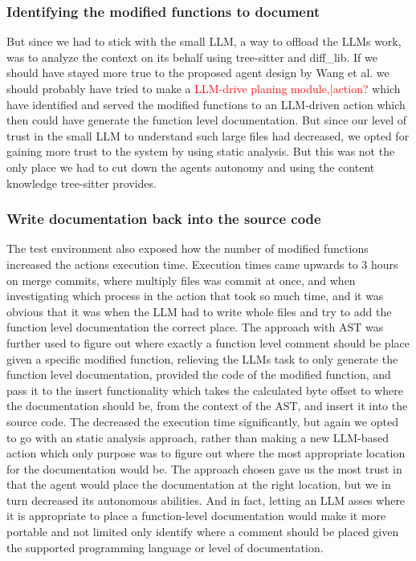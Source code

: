 \subsubsection*{Identifying the modified functions to document}
But since we had to stick with the small LLM, a way to offload the LLMs work, was to analyze the context on its behalf using tree-sitter and diff\_lib. If we should have stayed more true to the proposed agent design by Wang et al.\cite{wang2024survey} we should probably have tried to make a \textcolor{red}{LLM-drive planing module,|action?} which have identified and served the modified functions to an LLM-driven action which then could have generate the function level documentation. But since our level of trust in the small LLM to understand such large files had decreased, we opted for gaining more trust to the system by using static analysis. But this was not the only place we had to cut down the agents autonomy and using the content knowledge tree-sitter provides.
\subsubsection*{Write documentation back into the source code}
The test environment also exposed how the number of modified functions increased the actions execution time.
Execution times came upwards to 3 hours on merge commits, where multiply files was commit at once, and when investigating which process in the action that took so much time, and it was obvious that it was when the LLM had to write whole files and try to add the function level documentation the correct place. The approach with AST was further used to figure out where exactly a function level comment should be place given a specific modified function, relieving the LLMs task to only generate the function level documentation, provided the code of the modified function, and pass it to the insert functionality which takes the calculated byte offset to where the documentation should be, from the context of the AST, and insert it into the source code. The decreased the execution time significantly, but again we opted to go with an static analysis approach, rather than making a new LLM-based action which only purpose was to figure out where the most appropriate location for the documentation would be. The approach chosen gave us the most trust in that the agent would place the documentation at the right location, but we in turn decreased its autonomous abilities. And in fact, letting an LLM asses where it is appropriate to place a function-level documentation would make it more portable and not limited only identify where a comment should be placed given the supported programming language or level of documentation.
